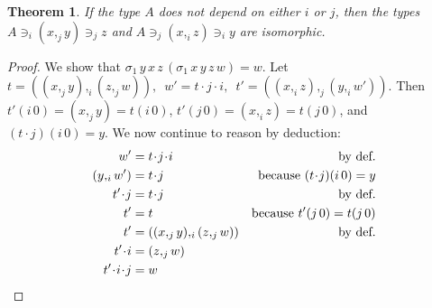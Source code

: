 \documentclass[english]{PaperTools/latex/entcs}
\theoremstyle{plain}
\newtheorem{theorem}{Theorem}
\theoremstyle{definition}
\theoremstyle{remark}
\newcommand\CP[3]{(#2,_{#1} #3)}
\newcommand\param[1]{\!\cdot\!#1}
\newcommand\op[1]{∋_{#1}}
\newcommand\mor[2]{({#1}\,{#2})}
\newcommand\proj[2]{{#2}\mor{#1}0}
\newcommand\projp[2]{\proj{#1}{(#2)}}
\def\ie{\textit{i.e.}}
\begin{document}
\begin{theorem}
  If the type $A$ does not depend on either $i$ or $j$, then
  the types $A \op i \CP j x y \op j z$ and $A \op j \CP i x z \op i y$ are isomorphic.
\end{theorem}
\begin{proof}
  We show that %
  $\sigma_1\, y\, x\, z\, (\sigma_1\, x\, y\, z\, w) = w$.
  Let
    $t = \CP i {\CP j x y}{\CP j z w},\enspace
    w' = t \param j \param i,\enspace
    t' = \CP j {\CP i x z}{\CP i y {w'}}.$
  Then
  $\proj i {t'} = \CP j x y = \proj i t$,
  $\proj j {t'} = \CP i x z = \proj j t$, and
  $\projp i {t\param j} = y$.
We now continue to reason by deduction:\\[-1.75\baselineskip]%
  \begin{align*}
    w' &= t \param j \param i & \text{by def.}\\
    {\CP i y {w'}} &= t\param j & \text{because $\projp i {t\param j} = y $}  \\
    t'\param j &= t\param j & \text{by def.}\\
    t' &= t &\text{because $\proj j {t'} = \proj j t$} \\
    t' &= \CP i {\CP j x y} {\CP j z w} & \text{by def.} \\
    t'\param i &= \CP j z w \\
    t'\param i\param j &= w
  \qedhere
  \end{align*}
\end{proof}
\end{document}
